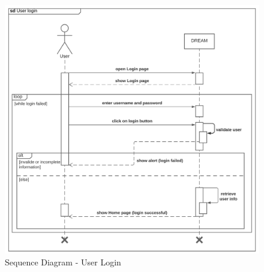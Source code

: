 \begin{center}
    \begin{figure}[H]
  \includegraphics[width=\textwidth,height=\textheight,keepaspectratio]{./Images/Sequence diagram User Login.png}
  \caption{Sequence Diagram - User Login}
\end{figure}

\end{center}
